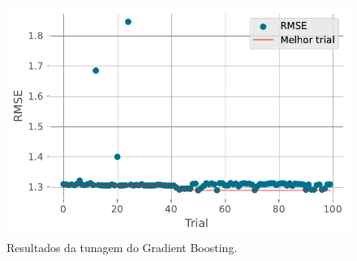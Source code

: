 \documentclass[
  12pt,
  a4paper,
]{scrreprt}
\begin{document}
\begin{figure}
\begin{minipage}{0.33\linewidth}
{\captionsetup{labelsep=none}\includegraphics{TCC_files/figure-pdf/fig-gdt_history-output-1.pdf}

}

\subcaption{\label{fig-gdt_history}}

\end{minipage}%
\newline
\begin{minipage}{\linewidth}


\subcaption{\label{fig-gdt_contour}}

\end{minipage}%

\caption{\label{fig-gdt_param}Resultados da tunagem do Gradient
Boosting.}

\end{figure}%
\end{document}
